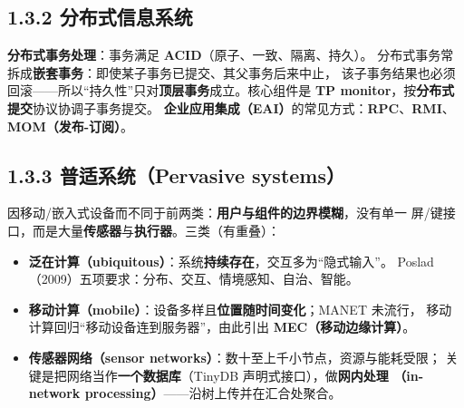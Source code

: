 
\subsection*{1.3.2 分布式信息系统}
\textbf{分布式事务处理}：事务满足 \textbf{ACID}（原子、一致、隔离、持久）。
分布式事务常拆成\textbf{嵌套事务}：即使某子事务已提交、其父事务后来中止，
该子事务结果也必须回滚——所以“持久性”只对\textbf{顶层事务}成立。核心组件是
\textbf{TP monitor}，按\textbf{分布式提交}协议协调子事务提交。
\textbf{企业应用集成（EAI）}的常见方式：\textbf{RPC}、\textbf{RMI}、
\textbf{MOM（发布-订阅）}。

\begin{closeread}
\end{closeread}


\subsection*{1.3.3 普适系统（Pervasive systems）}
因移动/嵌入式设备而不同于前两类：\textbf{用户与组件的边界模糊}，没有单一
屏/键接口，而是大量\textbf{传感器}与\textbf{执行器}。三类（有重叠）：

\begin{itemize}
  \item \textbf{泛在计算（ubiquitous）}：系统\textbf{持续存在}，交互多为“隐式输入”。
        Poslad（2009）五项要求：分布、交互、情境感知、自治、智能。
  \item \textbf{移动计算（mobile）}：设备多样且\textbf{位置随时间变化}；MANET 未流行，
        移动计算回归“移动设备连到服务器”，由此引出 \textbf{MEC（移动边缘计算）}。
  \item \textbf{传感器网络（sensor networks）}：数十至上千小节点，资源与能耗受限；
        关键是把网络当作\textbf{一个数据库}（TinyDB 声明式接口），做\textbf{网内处理
        （in-network processing）}——沿树上传并在汇合处聚合。
\end{itemize}

